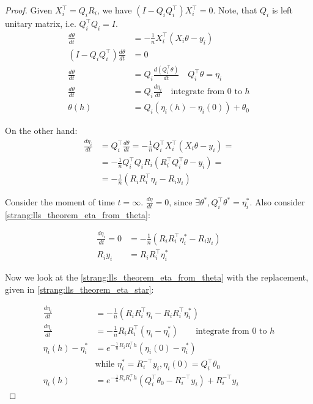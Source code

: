 \documentclass{article}
\begin{document}
\begin{proof}
Given $X_i^\top = Q_i R_i$, we have $(I - Q_iQ_i^\top)X_i^\top = 0$. Note, that $Q_i$ is left unitary matrix, i.e. $Q_i^\top Q_i = I$. 
\begin{align}
\nonumber \frac{d \theta}{d t} &= - \frac{1}{n} X_i^\top( X_i \theta - y_i) \\
\nonumber (I - Q_iQ_i^\top)\frac{d \theta}{d t} &= 0 \\
\nonumber \frac{d \theta}{d t} &= Q_i\frac{d (Q_i^\top\theta)}{d t} \quad Q_i^\top \theta = \eta_i\\ 
\nonumber \frac{d \theta}{d t} &= Q_i\frac{d \eta_i}{d t} \quad \text{integrate from $0$ to $h$}\\ 
\label{strang:lls_theorem_theta_from_eta}\theta(h) &= Q_i \left(\eta_i(h) - \eta_i(0) \right) + \theta_0
\end{align}

On the other hand:
\begin{align}\nonumber
\frac{d \eta_i}{d t} &= Q_i^\top\frac{d \theta}{d t} =  - \frac{1}{n} Q_i^\top  X_i^\top( X_i \theta - y_i) = \\ 
\nonumber&= - \frac{1}{n} Q_i^\top  Q_i R_i( R_i^\top Q_i^\top \theta - y_i) =\\
&= - \frac{1}{n} \left( R_iR_i^\top \eta_i - R_i y_i\right) \label{strang:lls_theorem_eta_from_theta}
\end{align}

Consider the moment of time $t = \infty$. $\frac{d \eta}{d t} = 0$, since $\exists \theta^*, Q_i^\top \theta^* = \eta_i^*$. Also consider \eqref{strang:lls_theorem_eta_from_theta}:

\begin{equation}\label{strang:lls_theorem_eta_star}
\begin{split}
\frac{d \eta_i}{d t} = 0 &= - \frac{1}{n} \left( R_iR_i^\top \eta_i^* - R_i y_i\right) \\ R_i y_i &= R_iR_i^\top \eta_i^*
\end{split}
\end{equation}

Now we look at the \eqref{strang:lls_theorem_eta_from_theta} with the replacement, given in \eqref{strang:lls_theorem_eta_star}:

\begin{align*}
\frac{d \eta_i}{d t} &= - \frac{1}{n} \left( R_iR_i^\top \eta_i- R_iR_i^\top \eta_i^*\right) \\
\frac{d \eta_i}{d t} &= - \frac{1}{n} R_iR_i^\top \left( \eta_i- \eta_i^*\right) \qquad \text{integrate from $0$ to $h$} \\
\eta_i(h) - \eta_i^* &= e^{- \frac{1}{n} R_iR_i^\top h} (\eta_i(0) - \eta_i^*) \\ 
&\text{while } \eta_i^* = R_i^{-\top}y_i, \eta_i(0) = Q_i^\top \theta_0 \\
\eta_i(h) &= e^{- \frac{1}{n} R_iR_i^\top h} (Q_i^\top \theta_0 - R_i^{-\top}y_i) + R_i^{-\top}y_i 
\end{align*}


\end{proof}
\end{document}
